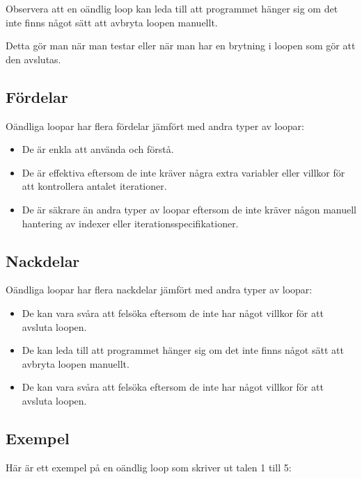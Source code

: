 Observera att en oändlig loop kan leda till att programmet hänger sig om
det inte finns något sätt att avbryta loopen manuellt.

Detta gör man när man testar eller när man har en brytning i loopen som
gör att den avslutas.

\hypertarget{fuxf6rdelar}{%
\subsection{Fördelar}\label{fuxf6rdelar}}

Oändliga loopar har flera fördelar jämfört med andra typer av loopar:

\begin{itemize}
\tightlist
\item
  De är enkla att använda och förstå.
\item
  De är effektiva eftersom de inte kräver några extra variabler eller
  villkor för att kontrollera antalet iterationer.
\item
  De är säkrare än andra typer av loopar eftersom de inte kräver någon
  manuell hantering av indexer eller iterationsspecifikationer.
\end{itemize}

\hypertarget{nackdelar}{%
\subsection{Nackdelar}\label{nackdelar}}

Oändliga loopar har flera nackdelar jämfört med andra typer av loopar:

\begin{itemize}
\tightlist
\item
  De kan vara svåra att felsöka eftersom de inte har något villkor för
  att avsluta loopen.
\item
  De kan leda till att programmet hänger sig om det inte finns något
  sätt att avbryta loopen manuellt.
\item
  De kan vara svåra att felsöka eftersom de inte har något villkor för
  att avsluta loopen.
\end{itemize}

\hypertarget{exempel}{%
\subsection{Exempel}\label{exempel}}

Här är ett exempel på en oändlig loop som skriver ut talen 1 till 5:


